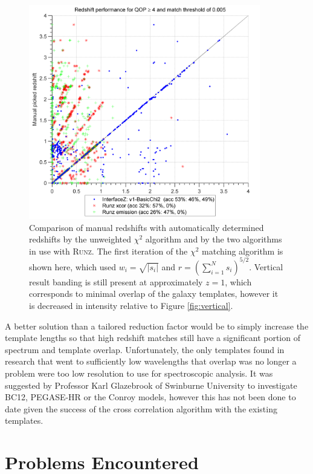 \documentclass[titlesmallcaps, examinerscopy, copyrightpage]{uqthesis}
\newcommand{\runz}{\textsc{Runz}}
\newcommand{\brac}[1]{\left( #1 \right)}
\newcommand\abs[1]{\left|#1\right|}
\begin{document}
\begin{figure}[ht!]
\includegraphics[width=0.9\textwidth]{images/Fullv1-BasicChi2.png} 
\centering
\caption{Comparison of manual redshifts with automatically determined redshifts by the unweighted $\chi^2$ algorithm and by the two algorithms in use with \runz{}. The first iteration of the $\chi^2$ matching algorithm is shown here, which used $w_i = \sqrt{\abs{s_i}}$ and $r = \brac{\sum_{i=1}^N s_i}^{5/2}$. Vertical result banding is still present at approximately $z=1$, which corresponds to minimal overlap of the galaxy templates, however it is decreased in intensity relative to Figure \ref{fig:vertical}.}
\label{fig:novertical}
\end{figure}

A better solution than a tailored reduction factor would be to simply increase the template lengths so that high redshift matches still have a significant portion of spectrum and template overlap. Unfortunately, the only templates found in research that went to sufficiently low wavelengths that overlap was no longer a problem were too low resolution to use for spectroscopic analysis. It was suggested by Professor Karl Glazebrook of Swinburne University to investigate BC12, PEGASE-HR or the Conroy models, however this has not been done to date given the success of the cross correlation algorithm with the existing templates.
\vspace{30mm}
\newpage
\section{Problems Encountered}
\end{document}
